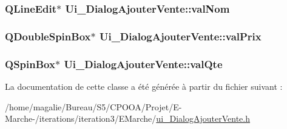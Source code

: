 \hypertarget{class_ui___dialog_ajouter_vente_a7f6dc97a576b62dc8412a347ec2acb25}{
\subsubsection[{val\-Nom}]{\setlength{\rightskip}{0pt plus 5cm}Q\-Line\-Edit$\ast$ Ui\-\_\-\-Dialog\-Ajouter\-Vente\-::val\-Nom}}\label{class_ui___dialog_ajouter_vente_a7f6dc97a576b62dc8412a347ec2acb25}
\hypertarget{class_ui___dialog_ajouter_vente_a125862f438ab182a8a49357a91bb37ef}{
\subsubsection[{val\-Prix}]{\setlength{\rightskip}{0pt plus 5cm}Q\-Double\-Spin\-Box$\ast$ Ui\-\_\-\-Dialog\-Ajouter\-Vente\-::val\-Prix}}\label{class_ui___dialog_ajouter_vente_a125862f438ab182a8a49357a91bb37ef}
\hypertarget{class_ui___dialog_ajouter_vente_a763e8a0d9e253d6da640fbac8b02459c}{
\subsubsection[{val\-Qte}]{\setlength{\rightskip}{0pt plus 5cm}Q\-Spin\-Box$\ast$ Ui\-\_\-\-Dialog\-Ajouter\-Vente\-::val\-Qte}}\label{class_ui___dialog_ajouter_vente_a763e8a0d9e253d6da640fbac8b02459c}


La documentation de cette classe a été générée à partir du fichier suivant \-:\begin{DoxyCompactItemize}
\item 
/home/magalie/\-Bureau/\-S5/\-C\-P\-O\-O\-A/\-Projet/\-E-\/\-Marche-\//iterations/iteration3/\-E\-Marche/\hyperlink{ui___dialog_ajouter_vente_8h}{ui\-\_\-\-Dialog\-Ajouter\-Vente.\-h}\end{DoxyCompactItemize}
